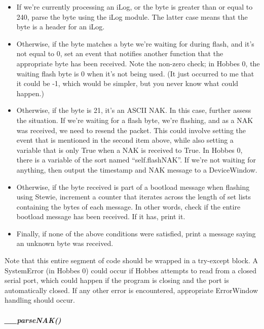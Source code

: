 \documentclass[12pt,letterpaper]{article}
\begin{document}
\begin{itemize}

\item If we're currently processing an iLog, or the byte is greater than or equal to 240, parse the byte using the iLog module. The latter case means that the byte is a header for an iLog.

\item Otherwise, if the byte matches a byte we're waiting for during flash, and it's not equal to 0, set an event that notifies another function that the appropriate byte has been received. Note the non-zero check; in Hobbes 0, the waiting flash byte is 0 when it's not being used. (It just occurred to me that it could be -1, which would be simpler, but you never know what could happen.)

\item Otherwise, if the byte is 21, it's an ASCII NAK. In this case, further assess the situation. If we're waiting for a flash byte, we're flashing, and as a NAK was received, we need to resend the packet. This could involve setting the event that is mentioned in the second item above, while also setting a variable that is only True when a NAK is received to True. In Hobbes 0, there is a variable of the sort named ``self.flashNAK''. If we're not waiting for anything, then output the timestamp and NAK message to a DeviceWindow.

\item Otherwise, if the byte received is part of a bootload message when flashing using Stewie, increment a counter that iterates across the length of set lists containing the bytes of each message. In other words, check if the entire bootload message has been received. If it has, print it.

\item Finally, if none of the above conditions were satisfied, print a message saying an unknown byte was received.

\end{itemize}

Note that this entire segment of code should be wrapped in a try-except block. A SystemError (in Hobbes 0) could occur if Hobbes attempts to read from a closed serial port, which could happen if the program is closing and the port is automatically closed. If any other error is encountered, appropriate ErrorWindow handling should occur.



%
%
\subparagraph{\_\_parseNAK()}
\label{4.3.1.2.3}
\end{document}
